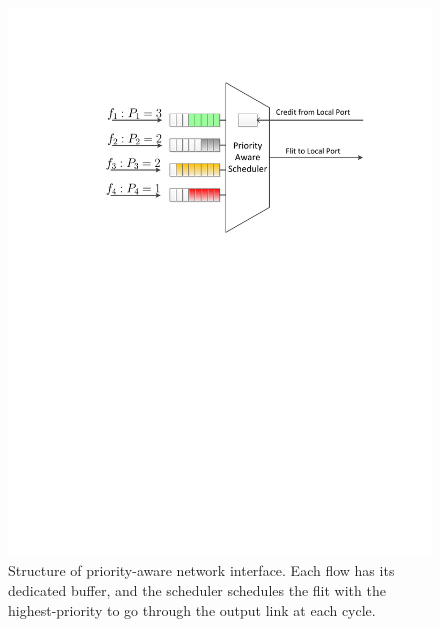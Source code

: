 \documentclass[preprint]{elsarticle}
\begin{document}
\begin{figure}
  \centering
  \includegraphics[scale=0.45]{figures/NI.pdf}
  \caption{Structure of priority-aware network interface. Each flow has its dedicated buffer, and the scheduler schedules the flit with the highest-priority to go through the output link at each cycle.}\label{ni}
\end{figure}
\end{document}
